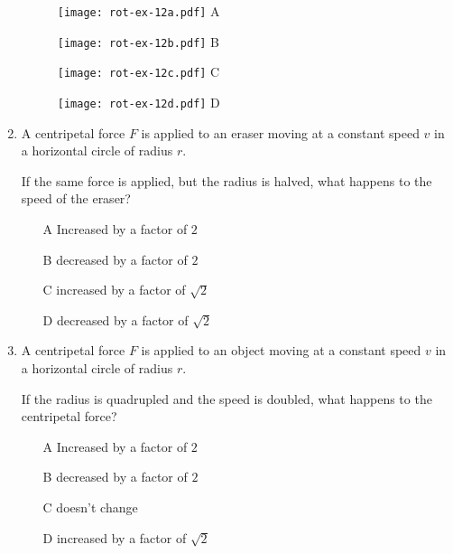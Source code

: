 \begin{enumerate}
\begin{figure}[H]

\centering

\begin{minipage}{.1\textwidth}
  \centering
  \texttt{[image: rot-ex-12a.pdf]}
  A
\end{minipage}
\hspace{1cm}
\begin{minipage}{.1\textwidth}
  \centering
  \texttt{[image: rot-ex-12b.pdf]}
  B
\end{minipage}
\hspace{1cm}
\begin{minipage}{.1\textwidth}
  \centering
  \texttt{[image: rot-ex-12c.pdf]}
  C
\end{minipage}
\hspace{1cm}
\begin{minipage}{.1\textwidth}
  \centering
  \texttt{[image: rot-ex-12d.pdf]}
  D
\end{minipage}
\end{figure}

\item A centripetal force $F$ is applied to an eraser moving at a constant speed $v$ in a horizontal circle of radius $r$.

If the same force is applied, but the radius is halved, what happens to the speed of the eraser?

\begin{itemize}
\item[A] Increased by a factor of $2$
\item[B] decreased by a factor of $2$  
\item[C] increased by a factor of $\sqrt{2}$  
\item[D] decreased by a factor of $\sqrt{2}$
\end{itemize}

\item A centripetal force $F$ is applied to an object moving at a constant speed $v$
in a horizontal circle of radius $r$.

If the radius is quadrupled and the speed is doubled, what happens to the centripetal force?

\begin{itemize}
\item[A] Increased by a factor of $2$
\item[B] decreased by a factor of $2$
\item[C] doesn’t change
\item[D] increased by a factor of $\sqrt{2}$
\end{itemize}



\end{enumerate}
